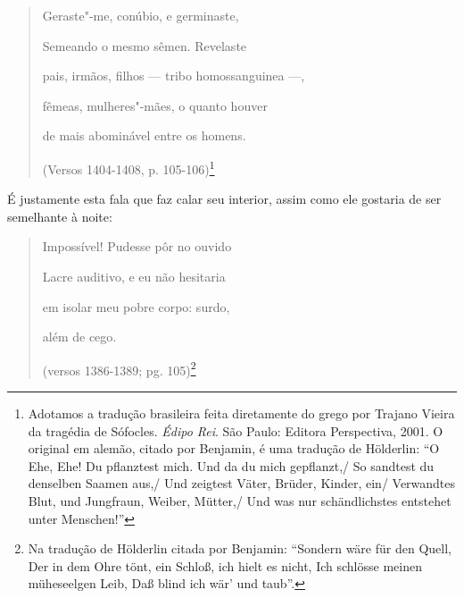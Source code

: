 \begin{verse}
Geraste"-me, conúbio, e germinaste,

Semeando o mesmo sêmen. Revelaste

pais, irmãos, filhos --- tribo homossanguinea ---,

fêmeas, mulheres"-mães, o quanto houver

de mais abominável entre os homens.

(Versos 1404-1408, p. 105-106)\footnote{Adotamos a tradução
  brasileira feita diretamente do grego por Trajano Vieira da tragédia
  de Sófocles. \emph{Édipo Rei}. São Paulo: Editora Perspectiva, 2001. O
  original em alemão, citado por Benjamin, é uma tradução de Hölderlin:
  ``O Ehe, Ehe! Du pflanztest mich. Und da du mich gepflanzt,/
  So sandtest du denselben Saamen aus,/
  Und zeigtest Väter, Brüder, Kinder, ein/
  Verwandtes Blut, und Jungfraun, Weiber, Mütter,/
  Und was nur schändlichstes entstehet unter Menschen!'' \versal{[N. T.]}}
\end{verse}

É justamente esta fala que faz calar seu interior, assim como ele
gostaria de ser semelhante à noite:

\begin{verse}
Impossível! Pudesse pôr no ouvido

Lacre auditivo, e eu não hesitaria

em isolar meu pobre corpo: surdo,

além de cego.

(versos 1386-1389; pg. 105)\footnote{Na tradução de Hölderlin
  citada por Benjamin: ``Sondern wäre für den Quell, Der in dem Ohre
  tönt, ein Schloß, ich hielt es nicht, Ich schlösse meinen müheseelgen
  Leib, Daß blind ich wär' und taub''. \versal{[N. T.]}}
\end{verse}

